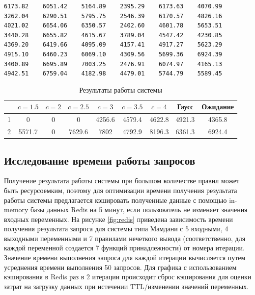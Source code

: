 \begin{lstlisting}[caption=Пример входных и выходных данных для генерации нечеткой экспертной системы (последний столбец - значения выходной переменной), label={lst:inout}]
6173.82    6051.42    5164.89    2395.29    6173.63    4070.99 
3262.04    6290.51    5795.75    2546.39    6170.57    4826.16 
4021.02    6654.06    6350.57    2402.60    4601.78    5653.51 
3440.28    6655.82    4615.67    3789.04    4547.42    4230.85 
4369.20    6419.66    4095.09    4157.41    4917.27    5623.29 
4915.10    6460.23    6069.10    4309.56    5699.36    6924.39 
3400.89    6695.89    7003.25    2476.91    6074.97    4165.13 
4942.51    6759.04    4182.98    4479.01    5744.79    5589.45 
\end{lstlisting}

\begin{table}[H]
		\captionsetup{justification=raggedright, singlelinecheck=false}
	\caption[]{\label{tab:tests} Результаты работы системы}
	\begin{center}
		\begin{tabular}{|c|c|c|c|c|c|c|c|c|}
			\hline
			& $c=1.5$ & $c=2$ & $c=2.5$ & $c=3$ & $c=3.5$ & $c=4$ & Гаусс & Ожидание\\
			\hline
			1 & 0 & 0 & 0 & 4256.6 & 4579.4 & 4622.8 & 4921.3 & 4365.8 \\
			\hline
			2 & 5571.7 & 0 & 7629.6 & 7802 & 4792.9 & 8196.3 & 6361.3 & 6924.4 \\
			\hline
		\end{tabular}

	\end{center}
\end{table}

\subsection{Исследование времени работы запросов}
Получение результата работы системы при большом количестве правил может быть ресурсоемким, поэтому для оптимизации времени получения результата работы системы предлагается кэшировать полученные данные с помощью in-memory базы данных Redis на 5 минут, если пользователь не изменяет значения входных переменных. На рисунке \ref{fig:redis} приведена зависимость времени получения результата запроса для системы типа Мамдани с 5 входными, 4 выходными переменными и 7 правилами нечеткого вывода (соответственно, для каждой переменной создается 7 функций принадлежности) от номера итерации. Значение времени выполнения запроса для каждой итерации вычисляется путем усреднения времени выполнения 50 запросов. Для графика с использованием кэширования в Redis раз в 2 итерации происходит сброс кэширования для оценки затрат на загрузку данных при истечении TTL/изменении значений переменных. 

